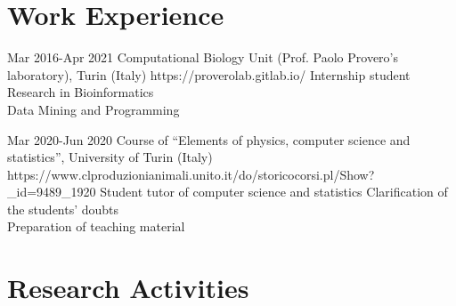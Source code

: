 \documentclass[10pt]{article} %
\begin{document}





\section{Work Experience}

\job
{Mar 2016-}{Apr 2021}
{Computational Biology Unit (Prof. Paolo Provero's laboratory), Turin (Italy)}
{https://proverolab.gitlab.io/}
{Internship student}
{
\bullet Research in Bioinformatics \\
\bullet Data Mining and Programming
}

\job
{Mar 2020-}{Jun 2020}
{Course of ``Elements of physics, computer science and statistics'', University of Turin (Italy)}
{https://www.clproduzionianimali.unito.it/do/storicocorsi.pl/Show?_id=9489_1920}
{Student tutor of computer science and statistics}
{
\bullet Clarification of the students' doubts \\
\bullet Preparation of teaching material
}

\section{Research Activities}
\end{document}
